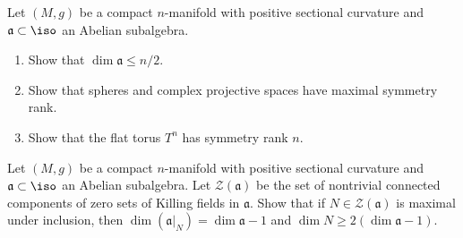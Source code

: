\begin{remark}
  \label{rem:pet-ch8-ex-8-4-15}

  Let $(M,g)$ be a compact $n$-manifold with positive sectional curvature and
  $\mathfrak a\subset\iso$ an Abelian subalgebra.
  \begin{enumerate}
    \item Show that $\dim\mathfrak a\le n/2$.
    \item Show that spheres and complex projective spaces have maximal
      symmetry rank.
    \item Show that the flat torus $T^n$ has symmetry rank $n$.
  \end{enumerate}
\end{remark}

\begin{remark}
  \label{rem:pet-ch8-ex-8-4-16}

  Let $(M,g)$ be a compact $n$-manifold with positive sectional curvature and
  $\mathfrak a\subset\iso$ an Abelian subalgebra. Let $\mathcal Z(\mathfrak a)$
  be the set of nontrivial connected components of zero sets of Killing fields
  in $\mathfrak a$. Show that if $N\in\mathcal Z(\mathfrak a)$ is maximal under
  inclusion, then $\dim(\mathfrak a|_N)=\dim\mathfrak a-1$ and
  $\dim N\ge2(\dim\mathfrak a-1)$.
\end{remark}

